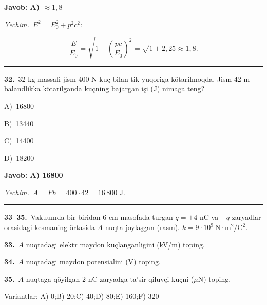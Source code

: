 \documentclass[11pt,a4paper]{article}
\newcommand{\opt}[2]{\hspace*{4mm}#1)\ #2\par}
\begin{document}
\noindent\colorbox{gray!12}{\parbox{\dimexpr\linewidth-2\fboxsep}{\textbf{Javob: A) $\approx1{,}8$}}}\par\smallskip
\noindent\textit{Yechim.}\ $E^2=E_0^2+p^2c^2$:\par
\[\frac{E}{E_0}=\sqrt{1+\left(\frac{pc}{E_0}\right)^2}=\sqrt{1+2{,}25}\approx1{,}8.\]\par\medskip\hrule\medskip
{}\noindent\begin{minipage}{\linewidth}
\textbf{32.}\ 32 kg massali jism 400 N kuç bilan tik yuqoriga kötarilmoqda. Jism 42 m balandlikka kötarilganda kuçning bajargan işi (J) nimaga teng?\par\smallskip
\opt{A}{16800}
\opt{B}{13440}
\opt{C}{14400}
\opt{D}{18200}
\end{minipage}\vspace{2pt}\par
\noindent\colorbox{gray!12}{\parbox{\dimexpr\linewidth-2\fboxsep}{\textbf{Javob: A) 16800}}}\par\smallskip
\noindent\textit{Yechim.}\ $A=Fh=400\cdot42=16\,800$ J.\par\par\medskip\hrule\medskip
\newpage\noindent\textbf{33–35.}\ Vakuumda bir-biridan 6 cm masofada turgan $q=+4$ nC va $-q$ zaryadlar orasidagi kesmaning örtasida $A$ nuqta joylaşgan (rasm). $k=9\cdot10^9\ \mathrm{N\cdot m^2/C^2}$.\par\medskip
\begin{center}\end{center}
\noindent\textbf{33.}\ $A$ nuqtadagi elektr maydon kuçlanganligini (kV/m) toping.\par
\noindent\textbf{34.}\ $A$ nuqtadagi maydon potensialini (V) toping.\par
\noindent\textbf{35.}\ $A$ nuqtaga qöyilgan $2$ nC zaryadga ta’sir qiluvçi kuçni ($\mu$N) toping.\par
\noindent Variantlar: A) 0;\quad B) 20;\quad C) 40;\quad D) 80;\quad E) 160;\quad F) 320\par\smallskip
\end{document}
